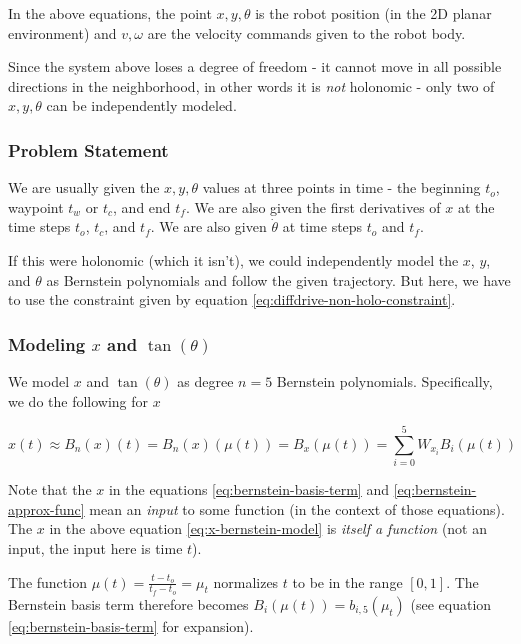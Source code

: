 In the above equations, the point  $x, y, \theta$ is the robot position (in the 2D planar environment) and $v, \omega$ are the velocity commands given to the robot body.

Since the system above loses a degree of freedom - it cannot move in all possible directions in the neighborhood, in other words it is \emph{not} holonomic - only two of $x, y, \theta$ can be independently modeled. 

\subsubsection{Problem Statement}

We are usually given the $x, y, \theta$ values at three points in time - the beginning $t_o$, waypoint $t_w$ or $t_c$, and end $t_f$. We are also given the first derivatives of $x$ at the time steps $t_o$, $t_c$, and $t_f$. We are also given $\dot{\theta}$ at time steps $t_o$ and $t_f$.

If this were holonomic (which it isn't), we could independently model the $x$, $y$, and $\theta$ as Bernstein polynomials and follow the given trajectory. But here, we have to use the constraint given by equation \ref{eq:diffdrive-non-holo-constraint}.

\subsubsection{Modeling \texorpdfstring{$x$ and $\tan(\theta)$}{x and tan}}

We model $x$ and $\tan(\theta)$ as degree $n=5$ Bernstein polynomials. Specifically, we do the following for $x$

\begin{equation}
    x(t) \approx B_n(x)(t) = B_n(x)(\mu(t)) = B_x(\mu(t)) = \sum_{i = 0}^{5} W_{x_i} B_i (\mu(t))
    \label{eq:x-bernstein-model}
\end{equation}

Note that the $x$ in the equations \ref{eq:bernstein-basis-term} and \ref{eq:bernstein-approx-func} mean an \emph{input} to some function (in the context of those equations). The $x$ in the above equation \ref{eq:x-bernstein-model} is \emph{itself a function} (not an input, the input here is time $t$).

The function $\mu(t) = \frac{t-t_o}{t_f - t_o} = \mu_t$ normalizes $t$ to be in the range $[0, 1]$. The Bernstein basis term therefore becomes $B_i(\mu(t)) = b_{i, 5}(\mu_t)$ (see equation \ref{eq:bernstein-basis-term} for expansion).

